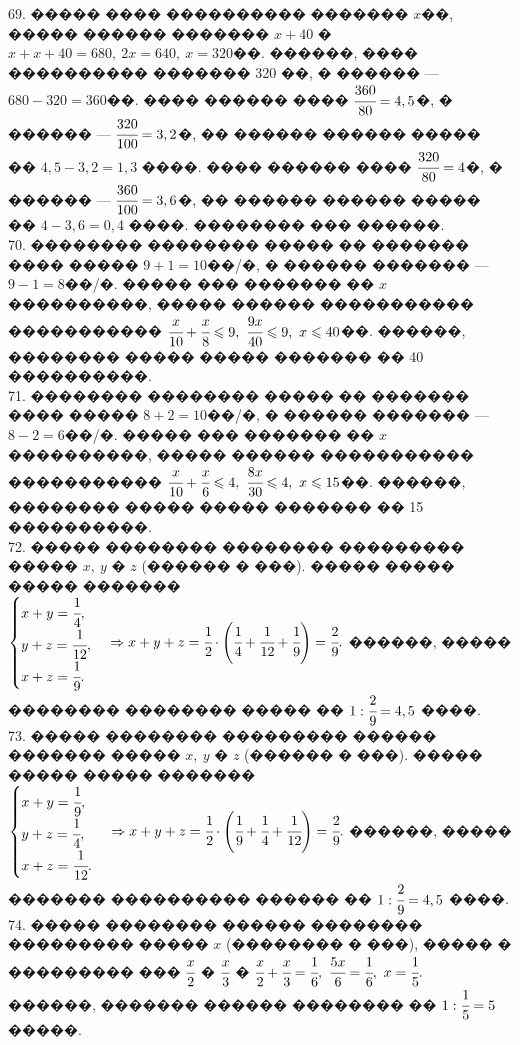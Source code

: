 \documentclass[12pt]{article}
\begin{document}
69. ����� ���� ���������� ������� $x$��, ����� ������ ������� $x+40$ � $x+x+40=680,\ 2x=640,\ x=320$��. ������, ���� ���������� ������� 320 ��, � ������ --- $680-320=360$��. ���� ������ ���� $\cfrac{360}{80}=4,5$�, � ������ --- $\cfrac{320}{100}=3,2$�, �� ������ ������ ����� �� $4,5-3,2=1,3$ ����. ���� ������ ���� $\cfrac{320}{80}=4$�, � ������ --- $\cfrac{360}{100}=3,6$�, �� ������ ������ ����� �� $4-3,6=0,4$ ����. �������� ��� ������.\\
70. �������� �������� ����� �� ������� ���� ����� $9+1=10$��/�, � ������ ������� --- $9-1=8$��/�. ����� ��� ������� �� $x$ ����������, ����� ������ ����������� ����������� $\cfrac{x}{10}+\cfrac{x}{8}\leqslant9,\ \cfrac{9x}{40}\leqslant9,\ x\leqslant40$��. ������, �������� ����� ����� ������� �� 40 ����������.\\
71. �������� �������� ����� �� ������� ���� ����� $8+2=10$��/�, � ������ ������� --- $8-2=6$��/�. ����� ��� ������� �� $x$ ����������, ����� ������ ����������� ����������� $\cfrac{x}{10}+\cfrac{x}{6}\leqslant4,\ \cfrac{8x}{30}\leqslant4,\ x\leqslant15$��. ������, �������� ����� ����� ������� �� 15 ����������.\\
72. ����� �������� �������� ��������� ����� $x,\ y$ � $z$ (������ � ���). ����� ����� ����� ������� $\begin{cases} x+y=\cfrac{1}{4},\\ y+z=\cfrac{1}{12},\\ x+z=\cfrac{1}{9}.\end{cases}\Rightarrow x+y+z=\cfrac{1}{2}\cdot\left(\cfrac{1}{4}+\cfrac{1}{12}+\cfrac{1}{9}\right)=\cfrac{2}{9}.$ ������, ����� �������� �������� ����� �� $1:\cfrac{2}{9}=4,5$ ����.\\
73. ����� �������� ��������� ������ ������� ����� $x,\ y$ � $z$ (������ � ���). ����� ����� ����� ������� $\begin{cases} x+y=\cfrac{1}{9},\\ y+z=\cfrac{1}{4},\\ x+z=\cfrac{1}{12}.\end{cases}\Rightarrow x+y+z=\cfrac{1}{2}\cdot\left(\cfrac{1}{9}+\cfrac{1}{4}+\cfrac{1}{12}\right)=\cfrac{2}{9}.$ ������, ����� ������� ���������� ������ �� $1:\cfrac{2}{9}=4,5$ ����.\\
74. ����� �������� ������ �������� ��������� ����� $x$ (�������� � ���), ����� � ��������� ��� $\cfrac{x}{2}$ � $\cfrac{x}{3}$ � $\cfrac{x}{2}+\cfrac{x}{3}=\cfrac{1}{6},\ \cfrac{5x}{6}=\cfrac{1}{6},\ x=\cfrac{1}{5}.$ ������, ������� ������ �������� �� $1:\cfrac{1}{5}=5$ �����.\\
\end{document}
